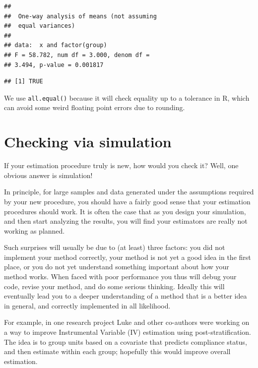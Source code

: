 \documentclass[
]{book}
\newenvironment{Shaded}{\begin{snugshade}}{\end{snugshade}}
\newcommand{\FunctionTok}[1]{\textcolor[rgb]{0.13,0.29,0.53}{\textbf{#1}}}
\newcommand{\NormalTok}[1]{#1}
\newcommand{\OtherTok}[1]{\textcolor[rgb]{0.56,0.35,0.01}{#1}}
\newcommand{\SpecialCharTok}[1]{\textcolor[rgb]{0.81,0.36,0.00}{\textbf{#1}}}
\begin{document}
\begin{verbatim}
## 
##  One-way analysis of means (not assuming
##  equal variances)
## 
## data:  x and factor(group)
## F = 58.782, num df = 3.000, denom df =
## 3.494, p-value = 0.001817
\end{verbatim}

\begin{Shaded}
\end{Shaded}

\begin{verbatim}
## [1] TRUE
\end{verbatim}

We use \texttt{all.equal()} because it will check equality up to a tolerance in R, which can avoid some weird floating point errors due to rounding.

\section{Checking via simulation}\label{checking-via-simulation}

If your estimation procedure truly is new, how would you check it?
Well, one obvious answer is simulation!

In principle, for large samples and data generated under the assumptions required by your new procedure, you should have a fairly good sense that your estimation procedures should work.
It is often the case that as you design your simulation, and then start analyzing the results, you will find your estimators are really not working as planned.

Such surprises will usually be due to (at least) three factors: you did not implement your method correctly, your method is not yet a good idea in the first place, or you do not yet understand something important about how your method works.
When faced with poor performance you thus will debug your code, revise your method, and do some serious thinking.
Ideally this will eventually lead you to a deeper understanding of a method that is a better idea in general, and correctly implemented in all likelihood.

For example, in one research project Luke and other co-authors were working on a way to improve Instrumental Variable (IV) estimation using post-stratification.
The idea is to group units based on a covariate that predicts compliance status, and then estimate within each group; hopefully this would improve overall estimation.
\end{document}
